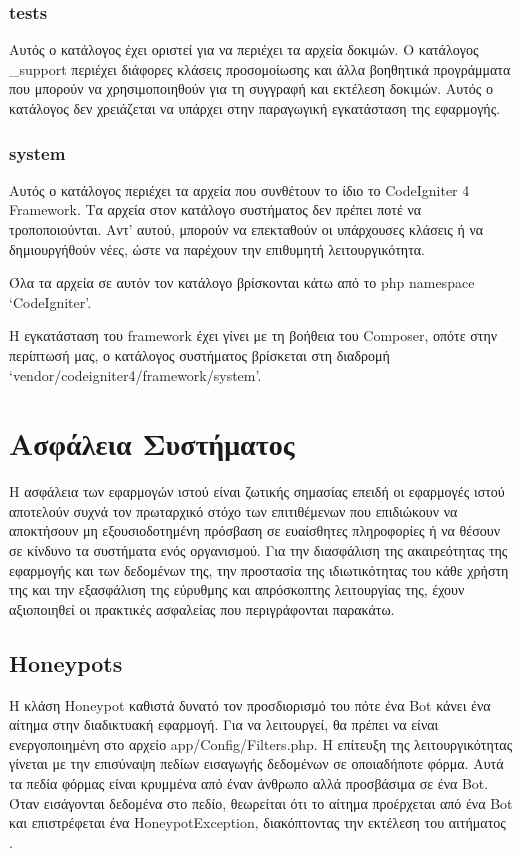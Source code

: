 \subsubsection{tests} \label{ui:tests}
Αυτός ο κατάλογος έχει οριστεί για να περιέχει τα αρχεία δοκιμών. Ο κατάλογος \_support περιέχει διάφορες κλάσεις προσομοίωσης και άλλα βοηθητικά προγράμματα που μπορούν να χρησιμοποιηθούν για τη συγγραφή και εκτέλεση δοκιμών. Αυτός ο κατάλογος δεν χρειάζεται να υπάρχει στην παραγωγική εγκατάσταση της εφαρμογής.

\subsubsection{system} \label{ui:system}
Αυτός ο κατάλογος περιέχει τα αρχεία που συνθέτουν το ίδιο το CodeIgniter 4 Framework. Tα αρχεία στον κατάλογο συστήματος δεν πρέπει ποτέ να τροποποιούνται. Αντ' αυτού, μπορούν να επεκταθούν οι υπάρχουσες κλάσεις ή να δημιουργήθούν νέες, ώστε να παρέχουν την επιθυμητή λειτουργικότητα.

Όλα τα αρχεία σε αυτόν τον κατάλογο βρίσκονται κάτω από το php namespace `CodeIgniter'.

Η εγκατάσταση του framework έχει γίνει με τη βοήθεια του Composer, οπότε στην περίπτωσή μας, ο κατάλογος συστήματος βρίσκεται στη διαδρομή `vendor/codeigniter4/framework/system'.

\section{Ασφάλεια Συστήματος}
Η ασφάλεια των εφαρμογών ιστού είναι ζωτικής σημασίας επειδή οι εφαρμογές ιστού αποτελούν συχνά τον πρωταρχικό στόχο των επιτιθέμενων που επιδιώκουν να αποκτήσουν μη εξουσιοδοτημένη πρόσβαση σε ευαίσθητες πληροφορίες ή να θέσουν σε κίνδυνο τα συστήματα ενός οργανισμού. Για την διασφάλιση της ακαιρεότητας της εφαρμογής και των δεδομένων της, την προστασία της ιδιωτικότητας του κάθε χρήστη της και την εξασφάλιση της εύρυθμης και απρόσκοπτης λειτουργίας της, έχουν αξιοποιηθεί οι πρακτικές ασφαλείας που περιγράφονται παρακάτω.

\subsection{Honeypots}
Η κλάση Honeypot καθιστά δυνατό τον προσδιορισμό του πότε ένα Bot κάνει ένα αίτημα στην διαδικτυακή εφαρμογή. Για να λειτουργεί, θα πρέπει να είναι ενεργοποιημένη στο αρχείο app/Config/Filters.php. Η επίτευξη της λειτουργικότητας γίνεται με την επισύναψη πεδίων εισαγωγής δεδομένων σε οποιαδήποτε φόρμα. Αυτά τα πεδία φόρμας είναι κρυμμένα από έναν άνθρωπο αλλά προσβάσιμα σε ένα Bot. Όταν εισάγονται δεδομένα στο πεδίο, θεωρείται ότι το αίτημα προέρχεται από ένα Bot και επιστρέφεται ένα HoneypotException, διακόπτοντας την εκτέλεση του αιτήματος \cite{CodeIgniter_honeypots}.

